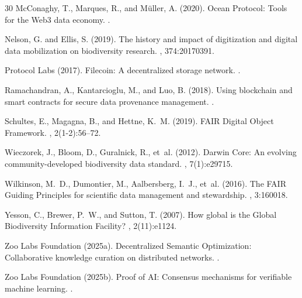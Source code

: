 \documentclass[11pt,a4paper]{article}
\begin{document}
\begin{thebibliography}{30}
McConaghy, T., Marques, R., and M\"{u}ller, A. (2020).
\newblock Ocean Protocol: Tools for the Web3 data economy.
.

Nelson, G. and Ellis, S. (2019).
\newblock The history and impact of digitization and digital data mobilization on biodiversity research.
, 374:20170391.

Protocol Labs (2017).
\newblock Filecoin: A decentralized storage network.
.

Ramachandran, A., Kantarcioglu, M., and Luo, B. (2018).
\newblock Using blockchain and smart contracts for secure data provenance management.
.

Schultes, E., Magagna, B., and Hettne, K.~M. (2019).
\newblock FAIR Digital Object Framework.
, 2(1-2):56--72.

Wieczorek, J., Bloom, D., Guralnick, R., et~al. (2012).
\newblock Darwin Core: An evolving community-developed biodiversity data standard.
, 7(1):e29715.

Wilkinson, M.~D., Dumontier, M., Aalbersberg, I.~J., et~al. (2016).
\newblock The FAIR Guiding Principles for scientific data management and stewardship.
, 3:160018.

Yesson, C., Brewer, P.~W., and Sutton, T. (2007).
\newblock How global is the Global Biodiversity Information Facility?
, 2(11):e1124.

Zoo Labs Foundation (2025a).
\newblock Decentralized Semantic Optimization: Collaborative knowledge curation on distributed networks.
.

Zoo Labs Foundation (2025b).
\newblock Proof of AI: Consensus mechanisms for verifiable machine learning.
.


\end{thebibliography}
\end{document}
